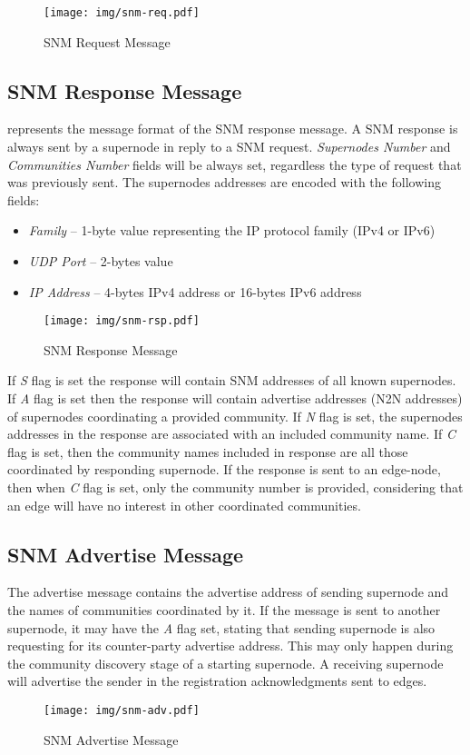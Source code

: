 \begin{figure}[hbtp]
\begin{center}
\texttt{[image: img/snm-req.pdf]}
\caption{SNM Request Message \label{img:snm-req}}
\end{center}
\end{figure}

\subsection{SNM Response Message}
\label{sub-sec:snm-response}
 represents the message format of the SNM response message. A SNM response is always sent by a supernode in reply to a SNM request. \emph{Supernodes Number} and \emph{Communities Number} fields will be always set, regardless the type of request that was previously sent.
The supernodes addresses are encoded with the following fields:
\begin{itemize}
\item \emph{Family} – 1-byte value representing the IP protocol family (IPv4 or IPv6)
\item \emph{UDP Port} – 2-bytes value 
\item \emph{IP Address} – 4-bytes IPv4 address or 16-bytes IPv6 address 
\end{itemize}

\begin{figure}[hbtp]
\begin{center}
\texttt{[image: img/snm-rsp.pdf]}
\caption{SNM Response Message \label{img:snm-rsp}}
\end{center}
\end{figure}

If \emph{S} flag is set the response will contain SNM addresses of all known supernodes. If \emph{A} flag is set then the response will contain advertise addresses (N2N addresses) of supernodes coordinating a provided community. If \emph{N} flag is set, the supernodes addresses in the response are associated with an included community name. If \emph{C} flag is set, then the community names included in response are all those coordinated by responding supernode. If the response is sent to an edge-node, then when \emph{C} flag is set, only the community number is provided, considering that an edge will have no interest in other coordinated communities.

\subsection{SNM Advertise Message}
\label{sub-sec:snm-advertise}
The advertise message contains the advertise address of sending supernode and the names of communities coordinated by it. If the message is sent to another supernode, it may have the \emph{A} flag set, stating that sending supernode is also requesting for its counter-party advertise address. This may only happen during the community discovery stage of a starting supernode. A receiving supernode will advertise the sender in the registration acknowledgments sent to edges.

\begin{figure}[hbtp]
\begin{center}
\texttt{[image: img/snm-adv.pdf]}
\caption{SNM Advertise Message \label{img:snm-adv}}
\end{center}
\end{figure}